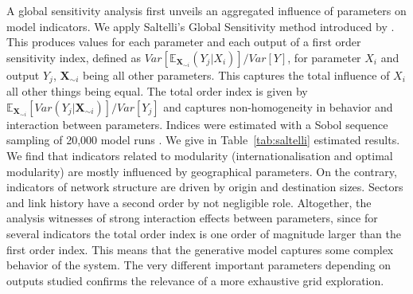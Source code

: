\documentclass[11pt]{article}
\begin{document}
A global sensitivity analysis first unveils an aggregated influence of parameters on model indicators. We apply Saltelli's Global Sensitivity method introduced by \cite{saltelli2008global}. This produces values for each parameter and each output of a first order sensitivity index, defined as $Var\left[\mathbb{E}_{\mathbf{X}_{\sim i}}\left(Y_j | X_i\right)\right] / Var\left[Y\right]$, for parameter $X_i$ and output $Y_j$, $\mathbf{X}_{\sim i}$ being all other parameters. This captures the total influence of $X_i$ all other things being equal. The total order index is given by $\mathbb{E}_{\mathbf{X}_{\sim i}} \left[Var(Y_j | \mathbf{X}_{\sim i})\right] / Var\left[Y_j\right]$ and captures non-homogeneity in behavior and interaction between parameters. Indices were estimated with a Sobol sequence sampling of 20,000 model runs \cite{saltelli2010variance}. We give in Table~\ref{tab:saltelli} estimated results. We find that indicators related to modularity (internationalisation and optimal modularity) are mostly influenced by geographical parameters. On the contrary, indicators of network structure are driven by origin and destination sizes. Sectors and link history have a second order by not negligible role. Altogether, the analysis witnesses of strong interaction effects between parameters, since for several indicators the total order index is one order of magnitude larger than the first order index. This means that the generative model captures some complex behavior of the system. The very different important parameters depending on outputs studied confirms the relevance of a more exhaustive grid exploration.
\end{document}
